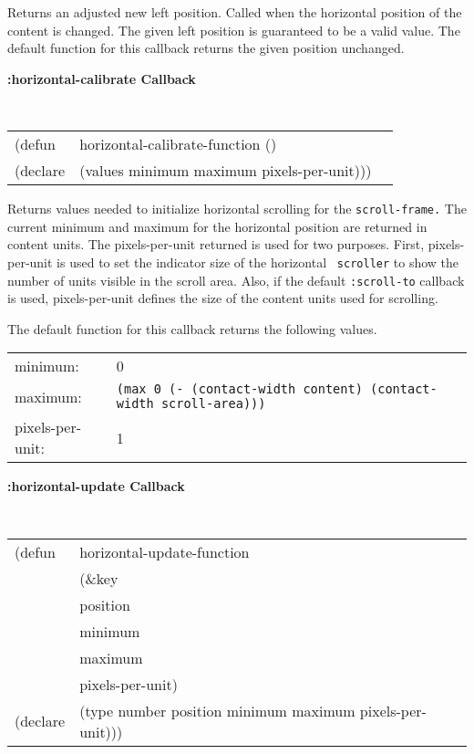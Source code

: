 \begin{flushright} \parbox[t]{6.125in}{ 
Returns an adjusted new left position.
Called when the horizontal position of the content is changed.  The given left
position is guaranteed to be a valid value.  The default function for this
callback returns the given position unchanged.

}\end{flushright}


{\samepage
{\large {\bf :horizontal-calibrate \hfill Callback}} 
\begin{flushright} 
\parbox[t]{6.125in}{
\tt
\begin{tabular}{lll}
\raggedright
(defun & horizontal-calibrate-function () \\
(declare & (values   minimum maximum pixels-per-unit)))
\end{tabular}
\rm

}\end{flushright}}

\begin{flushright} \parbox[t]{6.125in}{ 
Returns values needed to initialize
horizontal scrolling for the {\tt scroll-frame.}  The current minimum and
maximum for the horizontal position are returned in content units.
The pixels-per-unit returned is used for two purposes. First, pixels-per-unit
is used to set the indicator size of the horizontal {\tt
scroller} to show the number of units visible in the scroll area. Also, 
if the default {\tt :scroll-to} callback is used, pixels-per-unit defines the
size of the content units used for scrolling.  

The default
function for this callback returns the following values.  
\begin{center}
\begin{tabular}[t]{ll}
minimum: &	0 \\ 
maximum: &	 {\tt (max 0 (- (contact-width content) (contact-width scroll-area)))}\\
pixels-per-unit: & 1\\ 
\end{tabular}
\end{center}
}\end{flushright}


	

		


{\samepage
{\large {\bf :horizontal-update \hfill Callback}} 
\begin{flushright} 
\parbox[t]{6.125in}{
\tt
\begin{tabular}{lll}
\raggedright
(defun & horizontal-update-function & \\  
& (\&key \\
&  position \\
&  minimum \\
&  maximum \\
&  pixels-per-unit) \\
(declare &(type  number  position minimum maximum pixels-per-unit)))
\end{tabular}
\rm

}\end{flushright}}

